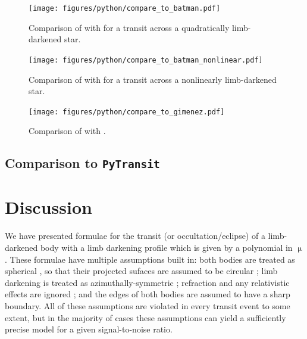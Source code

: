 \documentclass[modern]{aastex61}
\begin{document}
\begin{figure}
    \begin{centering}
    \texttt{[image: figures/python/compare\_to\_batman.pdf]}
    \caption{Comparison of \citet{Kreidberg2015} with \thiswork for
             a transit across a quadratically limb-darkened star.
    \label{fig:batman_comparison}}
    \end{centering}
\end{figure}

\begin{figure}
    \begin{centering}
    \texttt{[image: figures/python/compare\_to\_batman\_nonlinear.pdf]}
    \caption{Comparison of \citet{Kreidberg2015} with \thiswork for
             a transit across a nonlinearly limb-darkened star.
    \label{fig:batman_nonlinear_comparison}}
    \end{centering}
\end{figure}

\begin{figure}
    \begin{centering}
    \texttt{[image: figures/python/compare\_to\_gimenez.pdf]}
    \caption{Comparison of \citet{Gimenez2006} with \thiswork.
    \label{fig:gimenez_comparison}}
    \end{centering}
\end{figure}

\subsection{Comparison to \texttt{PyTransit}}

\section{Discussion}

We have presented formulae for the transit (or occultation/eclipse) of a
limb-darkened body with a limb darkening profile which is given by a polynomial
in $\upmu$.  These formulae have multiple assumptions built in:  both bodies
are treated as spherical \citep[but see][]{Seager2002,Hui2002}, so that their projected
sufaces are assumed to be circular \citep[but see][]{Barnes2003,Barnes2004,Barnes2009b,
DobbsDixon2012};  limb darkening is treated as azimuthally-symmetric \citep[but see][]{Barnes2009a}; 
refraction and any relativistic effects are ignored \citep[but see][]{Sidis2010}; 
and the edges of both bodies are assumed to have a sharp boundary.
All of these assumptions are violated in every transit event to some extent,
but in the majority of cases these assumptions can yield a sufficiently precise model for 
a given signal-to-noise ratio.
\end{document}

